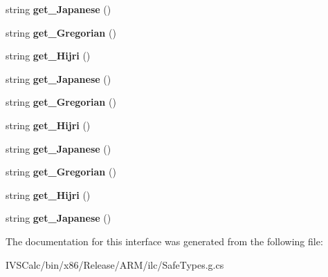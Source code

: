 \begin{DoxyCompactItemize}
string {\bfseries get\+\_\+\+Japanese} ()
\item 
\mbox{\label{interface_windows_1_1_globalization_1_1_i_calendar_identifiers_statics_af0c993ad0da3117055c97188db9cb890}} 
string {\bfseries get\+\_\+\+Gregorian} ()
\item 
\mbox{\label{interface_windows_1_1_globalization_1_1_i_calendar_identifiers_statics_a9decad6209b55da871f6a8faea25e34e}} 
string {\bfseries get\+\_\+\+Hijri} ()
\item 
\mbox{\label{interface_windows_1_1_globalization_1_1_i_calendar_identifiers_statics_a6196ccc385fdb253c76948bf0ca8614d}} 
string {\bfseries get\+\_\+\+Japanese} ()
\item 
\mbox{\label{interface_windows_1_1_globalization_1_1_i_calendar_identifiers_statics_af0c993ad0da3117055c97188db9cb890}} 
string {\bfseries get\+\_\+\+Gregorian} ()
\item 
\mbox{\label{interface_windows_1_1_globalization_1_1_i_calendar_identifiers_statics_a9decad6209b55da871f6a8faea25e34e}} 
string {\bfseries get\+\_\+\+Hijri} ()
\item 
\mbox{\label{interface_windows_1_1_globalization_1_1_i_calendar_identifiers_statics_a6196ccc385fdb253c76948bf0ca8614d}} 
string {\bfseries get\+\_\+\+Japanese} ()
\item 
\mbox{\label{interface_windows_1_1_globalization_1_1_i_calendar_identifiers_statics_af0c993ad0da3117055c97188db9cb890}} 
string {\bfseries get\+\_\+\+Gregorian} ()
\item 
\mbox{\label{interface_windows_1_1_globalization_1_1_i_calendar_identifiers_statics_a9decad6209b55da871f6a8faea25e34e}} 
string {\bfseries get\+\_\+\+Hijri} ()
\item 
\mbox{\label{interface_windows_1_1_globalization_1_1_i_calendar_identifiers_statics_a6196ccc385fdb253c76948bf0ca8614d}} 
string {\bfseries get\+\_\+\+Japanese} ()
\end{DoxyCompactItemize}


The documentation for this interface was generated from the following file\+:\begin{DoxyCompactItemize}
\item 
I\+V\+S\+Calc/bin/x86/\+Release/\+A\+R\+M/ilc/Safe\+Types.\+g.\+cs\end{DoxyCompactItemize}
